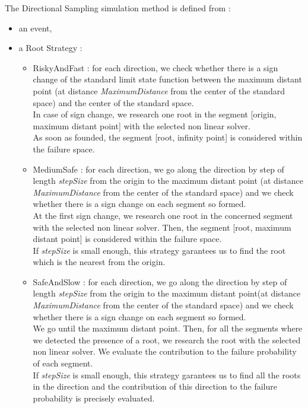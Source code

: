 The Directional Sampling simulation method is defined from :
\begin{itemize}
\item an event,
\item a Root Strategy :
  \begin{itemize}
  \item  RiskyAndFast : for each direction, we check whether there is a sign change of the standard limit state function between the maximum distant point (at distance {\itshape MaximumDistance} from the center of the standard space) and the center of the standard space. \\
    In case of sign change, we research one root in the segment [origin, maximum distant point] with the selected non linear solver.\\
    As soon as founded, the segment [root, infinity point] is considered within the failure space.

  \item MediumSafe : for each direction, we go along the direction by step of length {\itshape stepSize} from the origin to the maximum distant point (at distance {\itshape MaximumDistance} from the center of the standard space) and we check whether there is a sign change on each segment so formed.\\
    At the first sign change, we research one root in the concerned segment with the selected non linear solver. Then, the segment [root, maximum distant point] is considered within the failure space. \\
    If {\itshape stepSize} is small enough, this strategy garantees us to find the root which is the nearest from the origin.

  \item SafeAndSlow : for each direction, we go along the direction by step of length {\itshape stepSize} from the origin to the maximum distant point(at distance {\itshape MaximumDistance} from the center of the standard space) and we check whether there is a sign change on each segment so formed.\\
    We go until the maximum distant point.  Then, for all the segments where we detected the presence of a root, we research the root with the selected non linear solver. We evaluate the contribution to the failure probability of each segment. \\
    If {\itshape stepSize} is small enough, this strategy garantees us to find all the roots in the direction and the contribution of this direction to the failure probability is precisely evaluated.
  \end{itemize}


\end{itemize}
